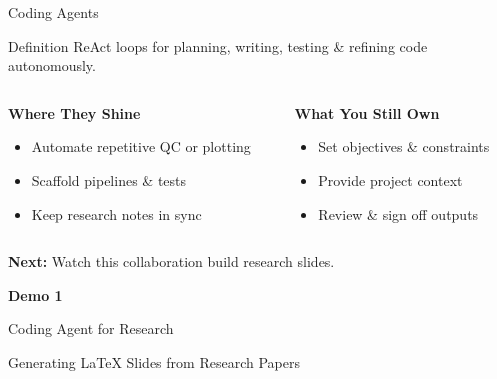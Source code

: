\documentclass[aspectratio=169]{beamer}
\begin{document}
\begin{frame}{Coding Agents}
  \begin{block}{Definition}
    ReAct loops for planning, writing, testing \& refining code autonomously\supercite{yao2023react}.
  \end{block}

  \vspace{0.5cm}

  \begin{columns}[T]
    \begin{column}{0.48\textwidth}
      \centering
      \large\bfseries
      \textcolor{conesaTeal}{Where They Shine}

      \vspace{0.3cm}
      \normalsize

      \begin{itemize}
        \item Automate repetitive QC or plotting
        \item Scaffold pipelines \& tests
        \item Keep research notes in sync
      \end{itemize}
    \end{column}
    \begin{column}{0.48\textwidth}
      \centering
      \large\bfseries
      \textcolor{conesaOrange}{What You Still Own}

      \vspace{0.3cm}
      \normalsize

      \begin{itemize}
        \item Set objectives \& constraints
        \item Provide project context
        \item Review \& sign off outputs
      \end{itemize}
    \end{column}
  \end{columns}

  \vspace{0.5cm}
  \centering
  \normalsize
  \textbf{Next:} Watch this collaboration build research slides.
\end{frame}

\begin{frame}[plain]
  \centering
  \vspace{2cm}
  {\Huge\bfseries\textcolor{conesaTeal}{Demo 1}}
  
  \vspace{0.8cm}
  {\Large Coding Agent for Research}
  
  \vspace{0.5cm}
  {\large Generating LaTeX Slides from Research Papers}
\end{frame}
\end{document}
